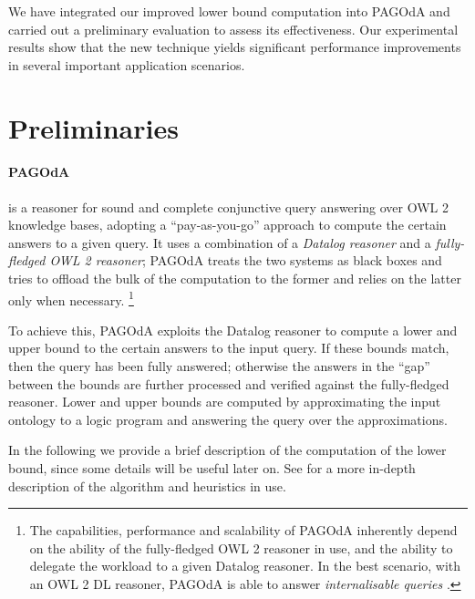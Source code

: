 \documentclass[runningheads]{llncs}
\newcommand{\pagoda}{\mbox{PAGOdA}\xspace}
\newcommand{\datalog}{\mbox{Datalog}\xspace}
\begin{document}
We have integrated our improved lower bound computation into \pagoda and carried out a preliminary evaluation to assess its effectiveness.
Our experimental results show that the new technique yields significant performance improvements in several important application scenarios.

\section{Preliminaries}\label{sec:preliminaries}

\paragraph{\pagoda}\label{par:pagoda}

is a reasoner for sound and complete conjunctive query answering over OWL 2 knowledge bases, adopting a ``pay-as-you-go'' approach to compute the certain answers to a given query.
%
It uses a combination of a \emph{\datalog reasoner} and a \emph{fully-fledged OWL 2 reasoner};
\pagoda treats the two systems as black boxes and tries to offload the bulk of the computation to the former and relies on the latter only when necessary. \footnote{
    The capabilities, performance and scalability of \pagoda inherently depend on the ability of the fully-fledged OWL 2 reasoner in use, and the ability to delegate the workload to a given \datalog reasoner.
    In the best scenario, with an OWL 2 DL reasoner, \pagoda is able to answer \emph{internalisable queries} \cite{horrocks2000}.
}

To achieve this, \pagoda exploits the \datalog reasoner to compute a lower and upper bound to the certain answers to the input query.
If these bounds match, then the query has been fully answered;
otherwise the answers in the ``gap'' between the bounds are further processed and verified against the fully-fledged reasoner.
Lower and upper bounds are computed by approximating the input ontology to a logic program and answering the query over the approximations.

In the following we provide a brief description of the computation of the lower bound, since some details will be useful later on.
See \cite{zhou2015} for a more in-depth description of the algorithm and heuristics in use.
\end{document}
